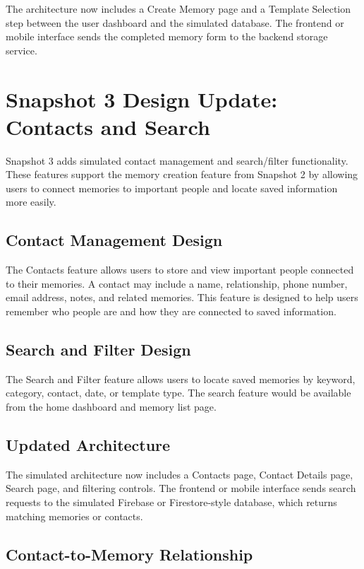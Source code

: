 \documentclass{article}
\begin{document}
The architecture now includes a Create Memory page and a Template Selection step between the user dashboard and the simulated database. The frontend or mobile interface sends the completed memory form to the backend storage service.

\section{Snapshot 3 Design Update: Contacts and Search}

Snapshot 3 adds simulated contact management and search/filter functionality. These features support the memory creation feature from Snapshot 2 by allowing users to connect memories to important people and locate saved information more easily.

\subsection{Contact Management Design}

The Contacts feature allows users to store and view important people connected to their memories. A contact may include a name, relationship, phone number, email address, notes, and related memories. This feature is designed to help users remember who people are and how they are connected to saved information.

\subsection{Search and Filter Design}

The Search and Filter feature allows users to locate saved memories by keyword, category, contact, date, or template type. The search feature would be available from the home dashboard and memory list page.

\subsection{Updated Architecture}

The simulated architecture now includes a Contacts page, Contact Details page, Search page, and filtering controls. The frontend or mobile interface sends search requests to the simulated Firebase or Firestore-style database, which returns matching memories or contacts.

\subsection{Contact-to-Memory Relationship}
\end{document}
